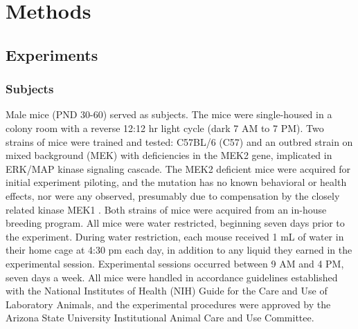 \section*{Methods}
\label{sec:methods}
\subsection*{Experiments}

\subsubsection*{Subjects}
\label{sec:methods_subjects}
Male mice (PND 30-60) served as subjects. The mice were single-housed in a colony room with a reverse 12:12 hr light cycle (dark 7 AM to 7 PM). Two strains of mice were trained and tested: C57BL/6 (C57) and an outbred strain on mixed background (MEK) with deficiencies in the MEK2 gene, implicated in ERK/MAP kinase signaling cascade. The MEK2 deficient mice were acquired for initial experiment piloting, and the mutation has no known behavioral or health effects, nor were any observed, presumably due to compensation by the closely related kinase MEK1 \cite{12832465}. Both strains of mice were acquired from an in-house breeding program. All mice were water restricted, beginning seven days prior to the experiment. During water restriction, each mouse received 1 mL of water in their home cage at 4:30 pm each day, in addition to any liquid they earned in the experimental session. Experimental sessions occurred between 9 AM and 4 PM, seven days a week. 
All mice were handled in accordance guidelines established with the National Institutes of Health (NIH) Guide for the Care and Use of Laboratory Animals, and the experimental procedures were approved by the Arizona State University Institutional Animal Care and Use Committee.